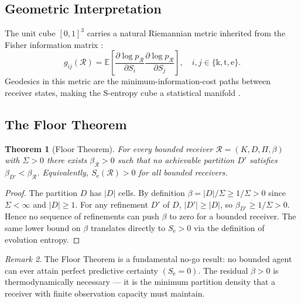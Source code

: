 \documentclass[twocolumn,11pt,a4paper]{article}
\theoremstyle{plain}
\newtheorem{theorem}{Theorem}[section]
\theoremstyle{definition}
\theoremstyle{remark}
\newtheorem{remark}[theorem]{Remark}
\newcommand{\Se}{S_{\mathrm{e}}}
\newcommand{\E}{\mathbb{E}}
\newcommand{\abs}[1]{\left|#1\right|}
\begin{document}
\subsection{Geometric Interpretation}

The unit cube $[0,1]^3$ carries a natural Riemannian metric inherited from the Fisher information matrix \citep{fisher1925,amari1998}:
\begin{equation}
  g_{ij}(\mathcal{R}) = \E\!\left[\frac{\partial \log p_\mathcal{R}}{\partial S_i}\frac{\partial \log p_\mathcal{R}}{\partial S_j}\right], \quad i,j\in\{\mathrm{k,t,e}\}.
\end{equation}
Geodesics in this metric are the minimum-information-cost paths between receiver states, making the S-entropy cube a statistical manifold \citep{docarmo1992}.

\subsection{The Floor Theorem}

\begin{theorem}[Floor Theorem]
\label{thm:floor}
For every bounded receiver $\mathcal{R} = (K,D,\Pi,\beta)$ with $\Sigma > 0$ there exists $\beta_{\mathcal{R}} > 0$ such that no achievable partition $D'$ satisfies $\beta_{D'} < \beta_{\mathcal{R}}$.  Equivalently, $\Se(\mathcal{R}) > 0$ for all bounded receivers.
\end{theorem}

\begin{proof}
The partition $D$ has $\abs{D}$ cells. By definition $\beta = \abs{D}/\Sigma \ge 1/\Sigma > 0$ since $\Sigma < \infty$ and $\abs{D} \ge 1$.  For any refinement $D'$ of $D$, $\abs{D'} \ge \abs{D}$, so $\beta_{D'} \ge 1/\Sigma > 0$.  Hence no sequence of refinements can push $\beta$ to zero for a bounded receiver.  The same lower bound on $\beta$ translates directly to $\Se > 0$ via the definition of evolution entropy.
\end{proof}

\begin{remark}
The Floor Theorem is a fundamental no-go result: no bounded agent can ever attain perfect predictive certainty $(\Se = 0)$.  The residual $\beta > 0$ is thermodynamically necessary — it is the minimum partition density that a receiver with finite observation capacity must maintain.
\end{remark}

\end{document}
